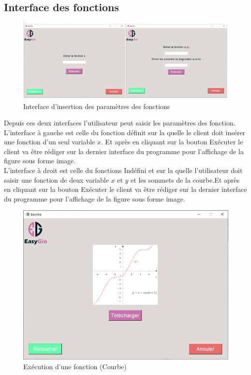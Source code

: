 \documentclass[a4paper]{report}
\begin{document}
\subsection{Interface des fonctions}
\begin{figure}[!h]
    \centering
    \includegraphics[width=14cm]{images/InputesInter.PNG}
    \caption{Interface d'insertion des paramètres des fonctions}
    \label{fig:Interface d'insertion des paramètres des fonctions}
\end{figure}
Depuis ces deux interfaces l'utilisateur peut saisir les paramètres des fonction.\\
L'interface à gauche est celle du fonction définit sur la quelle le client doit insérer une fonction d'un seul variable $x$. Et après en cliquant sur la bouton Exécuter le client va être rédiger sur la dernier interface du programme pour l'affichage de la figure sous forme image.\\
L'interface à droit est celle du fonctions Indéfini et sur la quelle l'utilisateur doit saisir une fonction de deux variable $x$ et $y$ et les sommets de la courbe.Et après en cliquant sur la bouton Exécuter le client va être rédiger sur la dernier interface du programme pour l'affichage de la figure sous forme image.\\
\begin{figure}[!h]
    \centering
    \includegraphics[width=14cm]{images/Fonction.PNG}
    \caption{Exécution d'une fonction (Courbe)}
    \label{fig:Exécution d'une fonction (Courbe)}
\end{figure}
\newpage
\end{document}
